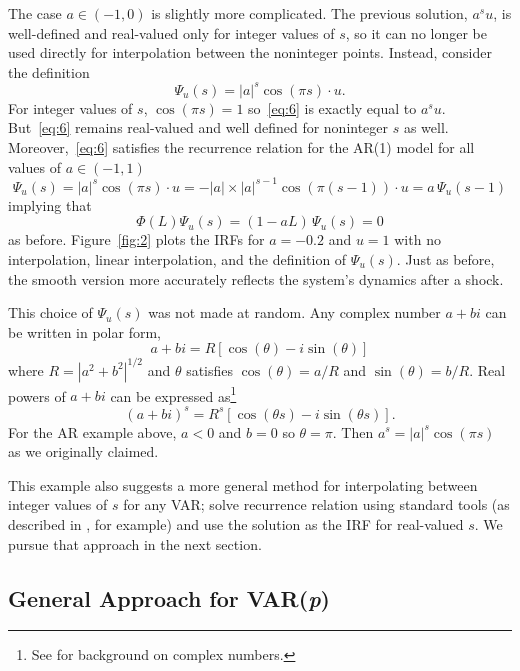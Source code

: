 \documentclass[12pt,fleqn]{article}
\begin{document}
The case $a \in (-1, 0)$ is slightly more complicated.  The previous
solution, $a^s u$, is well-defined and real-valued only for integer
values of $s$, so it can no longer be used directly for interpolation
between the noninteger points. Instead, consider the definition
\begin{equation}
  \label{eq:6}
  \Psi_u(s) = |a|^s \cos(\pi s) \cdot u.
\end{equation}
For integer values of $s$, $\cos(\pi s) = 1$ so~\eqref{eq:6} is
exactly equal to $a^s u$. But~\eqref{eq:6} remains real-valued and
well defined for noninteger $s$ as well. Moreover,~\eqref{eq:6}
satisfies the recurrence relation for the AR(1) model for all values
of $a \in (-1,1)$
\begin{equation*}
  \Psi_u(s) = |a|^s \cos(\pi s) \cdot u = - |a| \times |a|^{s-1} \cos(\pi (s-1)) \cdot u = a \, \Psi_u(s-1)
\end{equation*}
implying that
\begin{equation*}
  \Phi(L) \Psi_u(s) = (1 - a L) \, \Psi_u(s) = 0
\end{equation*}
as before. Figure~\ref{fig:2} plots the IRFs for $a = -0.2$ and
$u = 1$ with no interpolation, linear interpolation, and the
definition of $\Psi_u(s)$. Just as before, the smooth version more
accurately reflects the system's dynamics after a shock.

This choice of $\Psi_u(s)$ was not made at random. Any complex
number $a + bi$ can be written in polar form,
\[
a + bi = R [\cos(\theta) - i \sin(\theta)]
\]
where $R = |a^2 + b^2|^{1/2}$ and $\theta$ satisfies
$\cos(\theta) = a/R$ and $\sin(\theta) = b/R$. Real powers of $a + bi$
can be expressed as\footnote{%
  See \citet{Ham:94} for background on complex numbers.} %
\[
(a + bi)^s = R^s [\cos(\theta s) - i \sin(\theta s)].
\]
For the AR example above, $a < 0$ and $b = 0$ so $\theta = \pi$.
Then $a^s = |a|^s \cos(\pi s)$ as we originally claimed.

This example also suggests a more general method for interpolating
between integer values of $s$ for any VAR; solve recurrence relation
using standard tools (as described in \citealp{Ham:94}, for example)
and use the solution as the IRF for real-valued $s$. We pursue that
approach in the next section.

\subsection{General Approach for VAR(\textit{p})}
\label{S2.2}
\end{document}
